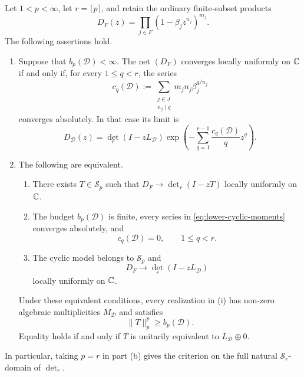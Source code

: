 \begin{theorem}
  \label{thm:ordinary-cyclic-regularized-realization}
  Let \(1<p<\infty\), let \(r=\lceil p\rceil\), and retain the ordinary
  finite-subset products
  \[
    D_F(z)=\prod_{j\in F}(1-\beta_jz^{n_j})^{m_j}.
  \]
  The following assertions hold.

  \begin{enumerate}[label=\textup{(\alph*)}]
    \item Suppose that \(b_p(\mathcal D)<\infty\).  The net \((D_F)\)
    converges locally uniformly on \(\mathbb{C}\) if and only if, for every
    \(1\le q<r\), the series
    \begin{equation}\label{eq:lower-cyclic-moments}
      c_q(\mathcal D)
      :=\sum_{\substack{j\in J\\ n_j\mid q}}
          m_jn_j\beta_j^{q/n_j}
    \end{equation}
    converges absolutely.  In that case its limit is
    \begin{equation}\label{eq:ordinary-regularized-discrepancy}
      D_{\mathcal D}(z)
      =\det_r(I-zL_{\mathcal D})
       \exp\!\left(-\sum_{q=1}^{r-1}
                    \frac{c_q(\mathcal D)}{q}z^q\right).
    \end{equation}

    \item The following are equivalent.
    \begin{enumerate}[label=\textup{(\roman*)}]
      \item There exists \(T\in\mathcal S_p\) such that
      \(D_F\to\det_r(I-zT)\) locally uniformly on \(\mathbb{C}\).
      \item The budget \(b_p(\mathcal D)\) is finite, every series in
      \eqref{eq:lower-cyclic-moments} converges absolutely, and
      \[
        c_q(\mathcal D)=0,
        \qquad 1\le q<r.
      \]
      \item The cyclic model belongs to \(\mathcal S_p\) and
      \[
        D_F\longrightarrow\det_r(I-zL_{\mathcal D})
      \]
      locally uniformly on \(\mathbb{C}\).
    \end{enumerate}
    Under these equivalent conditions, every realization in \textup{(i)}
    has non-zero algebraic multiplicities \(M_{\mathcal D}\) and satisfies
    \[
      \|T\|_p^p\ge b_p(\mathcal D).
    \]
    Equality holds if and only if \(T\) is unitarily equivalent to
    \(L_{\mathcal D}\oplus0\).
  \end{enumerate}
  In particular, taking \(p=r\) in part \textup{(b)} gives the criterion on
  the full natural \(\mathcal S_r\)-domain of \(\det_r\).
\end{theorem}

